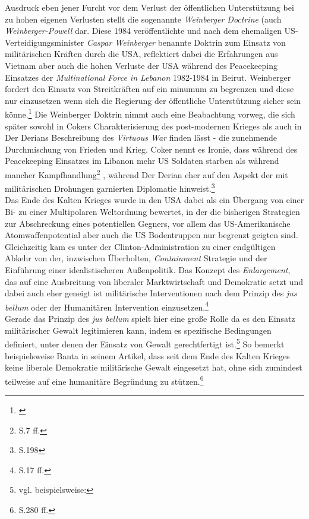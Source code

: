 \documentclass[11pt,a4paper,oneside,numbers=noenddot,bibliography=totocnumbered,DIV=13]{scrartcl}
\begin{document}
Ausdruck eben jener Furcht vor dem Verlust der öffentlichen Unterstützung bei zu hohen eigenen Verlusten stellt die sogenannte \textit{Weinberger Doctrine} (auch \textit{Weinberger-Powell} dar. Diese 1984 veröffentlichte und nach dem ehemaligen US-Verteidigungsminister \textit{Caspar Weinberger} benannte Doktrin zum Einsatz von militärischen Kräften durch die USA, reflektiert dabei die Erfahrungen aus Vietnam aber auch die hohen Verluste der USA während des Peacekeeping Einsatzes der \textit{Multinational Force in Lebanon} 1982-1984 in Beirut. Weinberger fordert den Einsatz von Streitkräften auf ein minumum zu begrenzen und diese nur einzusetzen wenn sich die Regierung der öffentliche Unterstützung sicher sein könne.\footnote{\cite{Weinberger28.11.1984}}  Die Weinberger Doktrin nimmt auch eine Beabachtung vorweg, die sich später sowohl in Cokers Charakterisierung des post-modernen Krieges als auch in Der Derians Beschreibung des \textit{Virtuous War} finden lässt - die zunehmende Durchmischung von Frieden und Krieg. Coker nennt es Ironie, dass während des Peacekeeping Einsatzes im Libanon mehr US Soldaten starben als während mancher Kampfhandlung\footnote{\cite{coker_postmodern_2008}S.7 ff.} , während Der Derian eher auf den Aspekt der mit militärischen Drohungen garnierten Diplomatie hinweist.\footnote{\cite{DerDerian2001}S.198}\\
Das Ende des Kalten Krieges wurde in den USA dabei als ein Übergang von einer Bi- zu einer Multipolaren Weltordnung bewertet, in der die bisherigen Strategien zur Abschreckung eines potentiellen Gegners, vor allem das US-Amerikanische Atomwaffenpotential aber auch die US Bodentruppen nur begrenzt geigten sind. Gleichzeitig  kam es unter der Clinton-Administration zu einer endgültigen Abkehr von der, inzwischen Überholten, \textit{Containment} Strategie und der Einführung einer idealistischeren Außenpolitik. Das Konzept des \textit{Enlargement}, das auf eine Ausbreitung von liberaler Marktwirtschaft und Demokratie setzt und dabei auch eher geneigt ist militärische Interventionen nach dem Prinzip des \textit{jus bellum} oder der Humanitären Intervention einzusetzen.\footnote{\cite{DerDerian2001}S.17 ff.}\\ Gerade das Prinzip des \textit{jus bellum} spielt hier eine große Rolle da es den Einsatz militärischer Gewalt legitimieren kann, indem es spezifische Bedingungen definiert, unter denen der Einsatz von Gewalt gerechtfertigt ist.\footnote{vgl. beispielsweise:\cite{rengger_just_2002}} So bemerkt beispielsweise Banta in seinem Artikel, dass seit dem Ende des Kalten Krieges keine liberale Demokratie militärische Gewalt eingesetzt hat, ohne sich zumindest teilweise auf eine humanitäre Begründung zu stützen.\footnote{\cite{banta_virtuous_2011}S.280 ff.}     
\end{document}
